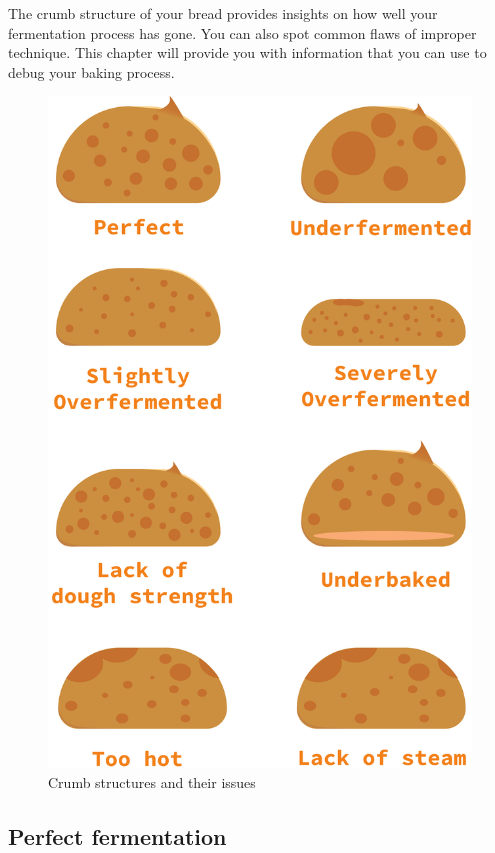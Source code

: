 The crumb structure of your bread provides insights on how well
your fermentation process has gone. You can also spot common flaws
of improper technique. This chapter will provide you with information
that you can use to debug your baking process.

\begin{figure}
  \includegraphics[width=\textwidth]{crumb-structures-book}
  \caption{Crumb structures and their issues}
  \label{fig:crumb-structures-book}
\end{figure}

\subsection{Perfect fermentation}

